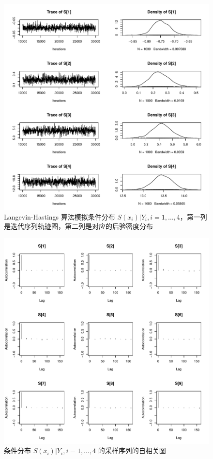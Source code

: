 \documentclass[12pt,a4paper,UTF8,twoside]{book}
\theoremstyle{definition}
\theoremstyle{definition}
\theoremstyle{definition}
\theoremstyle{remark}
\begin{document}
\begin{figure}[!htb]

{\centering \includegraphics[width=0.7\linewidth]{figures/rongelap-mcml-diagnosis-trace-9} 

}

\caption{Langevin-Hastings 算法模拟条件分布 \(S(x_{i})|Y_{i}, i = 1,\ldots,4\)，第一列是迭代序列轨迹图，第二列是对应的后验密度分布}\label{fig:rongelap-trace-plot}
\end{figure}
\begin{figure}[!htb]

{\centering \includegraphics[width=0.7\linewidth]{figures/rongelap-mcml-diagnosis-acf-9} 

}

\caption{条件分布 \(S(x_{i})|Y_{i}, i = 1, \ldots, 4\) 的采样序列的自相关图}\label{fig:rongelap-acf-plot}
\end{figure}
\end{document}

